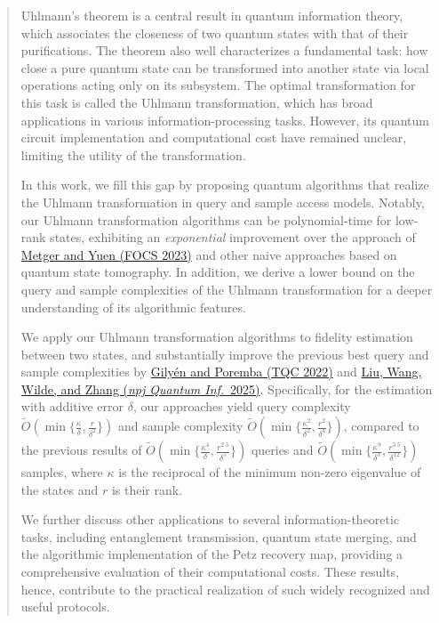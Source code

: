 \documentclass[superscriptaddress,11pt,bibliography]{article}
\theoremstyle{definition}
\theoremstyle{definition}
\begin{document}
\begin{titlepage}
\begin{center}



\vspace*{1.5cm}


\begin{abstract}

Uhlmann's theorem is a central result in quantum information theory, which associates the closeness of two quantum states with that of their purifications. The theorem also well characterizes a fundamental task: how close a pure quantum state can be transformed into another state via local operations acting only on its subsystem. The optimal transformation for this task is called the Uhlmann transformation, which has broad applications in various information-processing tasks. However, its quantum circuit implementation and computational cost have remained unclear, limiting the utility of the transformation.

In this work, we fill this gap by proposing quantum algorithms that realize the Uhlmann transformation in query and sample access models. Notably, our Uhlmann transformation algorithms can be polynomial-time for low-rank states, exhibiting an \textit{exponential} improvement over the approach of \hyperlink{cite.metger2023stateqipspace}{Metger and Yuen (FOCS 2023)} and other naive approaches based on quantum state tomography. In addition, we derive a lower bound on the query and sample complexities of the Uhlmann transformation for a deeper understanding of its algorithmic features.

We apply our Uhlmann transformation algorithms to fidelity estimation between two states, and substantially improve the previous best query and sample complexities by \hyperlink{cite.gilyen2022improvedfidelity}{Gily\'en and Poremba (TQC 2022)} and \hyperlink{cite.Liu2024geometricmean}{Liu, Wang, Wilde, and Zhang (\textit{npj Quantum Inf.}\ 2025)}. Specifically, for the estimation with additive error $\delta$, our approaches yield query complexity $\tilde O(\min\{\frac{\kappa}{\delta}, \frac{r}{\delta^2}\})$ and sample complexity $\tilde O(\min\{\frac{\kappa^2}{\delta^2}, \frac{r^2}{\delta^4}\})$, compared to the previous results of $\tilde O(\min\{\frac{\kappa^4}{\delta}, \frac{r^{2.5}}{\delta^{5}}\})$ queries and $\tilde O(\min\{\frac{\kappa^9}{\delta^3}, \frac{r^{5.5}}{\delta^{12}}\})$ samples, where $\kappa$ is the reciprocal of the minimum non-zero eigenvalue of the states and $r$ is their rank. 

We further discuss other applications to several information-theoretic tasks, including entanglement transmission, quantum state merging, and the algorithmic implementation of the Petz recovery map, providing a comprehensive evaluation of their computational costs. These results, hence, contribute to the practical realization of such widely recognized and useful protocols.


\end{abstract}
\end{center}
\end{titlepage}
\end{document}
